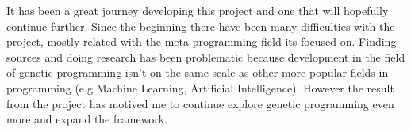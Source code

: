It has been a great journey developing this project and one that will hopefully continue further. Since the
beginning there have been many difficulties with the project, mostly related with the meta-programming field
its focused on. Finding sources and doing research has been problematic because development in the field  of genetic programming 
isn't on the same scale as other more popular fields in programming (e.g Machine Learning, Artificial Intelligence).
However the result from the project has motived me to continue explore genetic programming even more and expand the
framework.